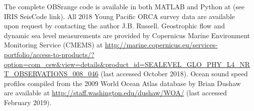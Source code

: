 The complete OBSrange code is available in both MATLAB and Python at (see IRIS SeisCode link). All 2018 Young Pacific ORCA survey data are available upon request by contacting the author J.B. Russell. Geostrophic flow and dynamic sea level measurements are provided by Copernicus
Marine Environment Monitoring Service (CMEMS) at \href{http://marine.copernicus.eu/services-portfolio/access-to-products/?option=com_csw\&view=details\&product_id=SEALEVEL_GLO_PHY_L4_NRT_OBSERVATIONS_008_046}{http://marine.copernicus.eu/services-portfolio/access-to-products/?option=com\_csw\&view=details\&product\_id=SEALEVEL\_GLO\_PHY\_L4\_NRT\_OBSERVATIONS\_008\_046} (last accessed October 2018). Ocean sound speed profiles compiled from the 2009 World Ocean Atlas database by Brian Dushaw are available at \href{http://staff.washington.edu/dushaw/WOA/}{http://staff.washington.edu/dushaw/WOA/} (last accessed February 2019).